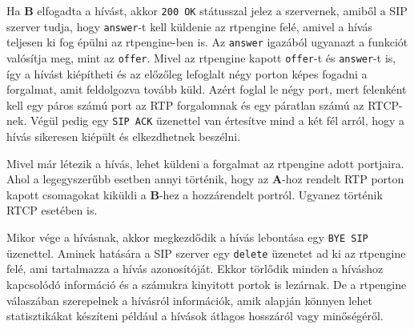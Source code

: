 Ha \textbf{B} elfogadta a hívást, akkor \texttt{200 OK} státusszal jelez a szervernek, 
amiből a SIP szerver tudja, hogy \texttt{answer}-t kell küldenie az rtpengine felé, 
amivel a hívás teljesen ki fog épülni az rtpengine-ben is. Az \texttt{answer} igazából 
ugyanazt a funkciót valósítja meg, mint az \texttt{offer}. Mivel az rtpengine kapott 
\texttt{offer}-t és \texttt{answer}-t is, így a hívást kiépítheti és az előzőleg 
lefoglalt négy porton képes fogadni a forgalmat, amit feldolgozva tovább küld. Azért 
foglal le négy port, mert felenként kell egy páros számú port az RTP forgalomnak és egy 
páratlan számú az RTCP-nek. Végül pedig egy \texttt{SIP ACK} üzenettel van értesítve mind 
a két fél arról, hogy a hívás sikeresen kiépült és elkezdhetnek beszélni. 

Mivel már létezik a hívás, lehet küldeni a forgalmat az rtpengine adott 
portjaira. Ahol a legegyszerűbb esetben annyi történik, hogy az \textbf{A}-hoz rendelt
RTP porton kapott csomagokat kiküldi a \textbf{B}-hez a hozzárendelt portról. Ugyanez
történik RTCP esetében is. 

Mikor vége a hívásnak, akkor megkezdődik a hívás lebontása egy \texttt{BYE SIP} 
üzenettel. Aminek hatására a SIP szerver egy \texttt{delete} üzenetet ad ki az rtpengine 
felé, ami tartalmazza a hívás azonosítóját. Ekkor törlődik minden a híváshoz kapcsolódó 
információ és a számukra kinyitott portok is lezárnak. De a rtpengine válaszában 
szerepelnek a hívásról információk, amik alapján könnyen lehet statisztikákat készíteni 
például a hívások átlagos hosszáról vagy minőségéről.